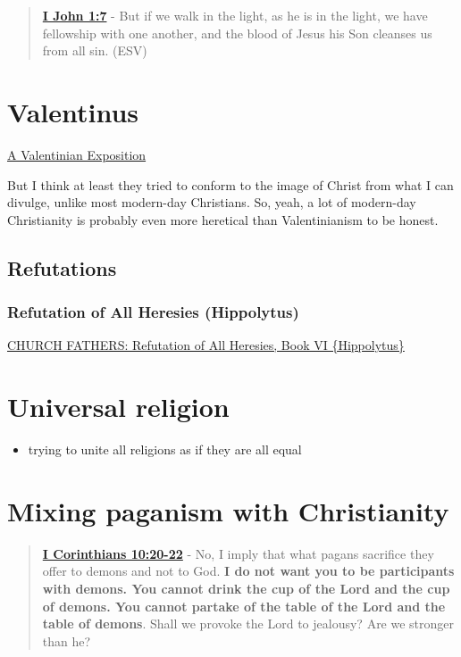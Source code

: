 \documentclass[11pt]{article}
\begin{document}
\begin{quote}
\textbf{\href{https://www.biblegateway.com/passage/?search=1\%20John\%201\%3A7\&version=ESV}{I John 1:7}} - But if we walk in the light, as he is in the light, we have fellowship with one another, and the blood of Jesus his Son cleanses us from all sin. (ESV)
\end{quote}

\section{Valentinus}
\label{sec:orgec7f676}
\href{https://www.earlychristianwritings.com/text/valentinian.html}{A Valentinian Exposition}

But I think at least they tried to conform to the image of Christ from what I can divulge, unlike most modern-day Christians.
So, yeah, a lot of modern-day Christianity is probably even more heretical than Valentinianism to be honest.

\subsection{Refutations}
\label{sec:orgf12732f}
\subsubsection{Refutation of All Heresies (Hippolytus)}
\label{sec:org5212de4}

\href{https://www.newadvent.org/fathers/050106.htm}{CHURCH FATHERS: Refutation of All Heresies, Book VI \{Hippolytus\}}

\section{Universal religion}
\label{sec:orgd7af559}
\begin{itemize}
\item trying to unite all religions as if they are all equal
\end{itemize}

\section{Mixing paganism with Christianity}
\label{sec:orgda06579}
\begin{quote}
\textbf{\href{https://www.biblegateway.com/passage/?search=1\%20Corinthians\%2010\%3A20-22\&version=ESV}{I Corinthians 10:20-22}} - No, I imply that what pagans sacrifice they offer to demons and not to God. \textbf{I do not want you to be participants with demons. You cannot drink the cup of the Lord and the cup of demons. You cannot partake of the table of the Lord and the table of demons}. Shall we provoke the Lord to jealousy? Are we stronger than he?
\end{quote}
\end{document}
